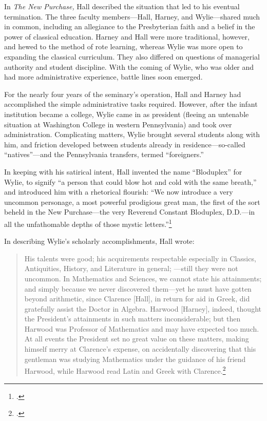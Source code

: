 \documentclass[
  american,
  letterpaper,
]{scrreprt}
\begin{document}
In \emph{The New Purchase,} Hall described the situation that led to his
eventual termination. The three faculty members---Hall, Harney, and
Wylie---shared much in common, including an allegiance to the
Presbyterian faith and a belief in the power of classical education.
Harney and Hall were more traditional, however, and hewed to the method
of rote learning, whereas Wylie was more open to expanding the classical
curriculum. They also differed on questions of managerial authority and
student discipline. With the coming of Wylie, who was older and had more
administrative experience, battle lines soon emerged.

For the nearly four years of the seminary's operation, Hall and Harney
had accomplished the simple administrative tasks required. However,
after the infant institution became a college, Wylie came in as
president (fleeing an untenable situation at Washington College in
western Pennsylvania) and took over administration. Complicating
matters, Wylie brought several students along with him, and friction
developed between students already in residence---so-called
``natives''---and the Pennsylvania transfers, termed ``foreigners.''

In keeping with his satirical intent, Hall invented the name
``Bloduplex'' for Wylie, to signify ``a person that could blow hot and
cold with the same breath,'' and introduced him with a rhetorical
flourish: ``We now introduce a very uncommon personage, a most powerful
prodigious great man, the first of the sort beheld in the New
Purchase---the very Reverend Constant Bloduplex, D.D.---in all the
unfathomable depths of those mystic letters.''\footnote{.}

In describing Wylie's scholarly accomplishments, Hall wrote:

\begin{quote}
His talents were good; his acquirements respectable especially in
Classics, Antiquities, History, and Literature in general; ---still they
were not uncommon. In Mathematics and Sciences, we cannot state his
attainments; and simply because we never discovered them---yet he must
have gotten beyond arithmetic, since Clarence {[}Hall{]}, in return for
aid in Greek, did gratefully assist the Doctor in Algebra. Harwood
{[}Harney{]}, indeed, thought the President's attainments in such
matters inconsiderable; but then Harwood was Professor of Mathematics
and may have expected too much. At all events the President set no great
value on these matters, making himself merry at Clarence's expense, on
accidentally discovering that this gentleman was studying Mathematics
under the guidance of his friend Harwood, while Harwood read Latin and
Greek with Clarence.\footnote{.}
\end{quote}
\end{document}
